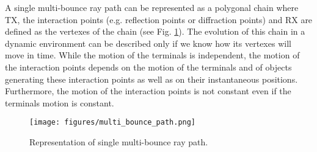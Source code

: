 A single multi-bounce ray path can be represented as a polygonal chain where TX, the interaction points (e.g. reflection points or diffraction points) and RX are defined as the vertexes of the chain (see Fig. \ref{ray_path}). The evolution of this chain in a dynamic environment can be described only if we know how its vertexes will move in time. While the motion of the terminals is independent, the motion of the interaction points depends on the motion of the terminals and of objects generating these interaction points as well as on their instantaneous positions. Furthermore, the motion of the interaction points is not constant even if the terminals motion is constant. \par

\begin{figure}[h!]
	\centering
	\texttt{[image: figures/multi\_bounce\_path.png]}
	\caption{Representation of single multi-bounce ray path.}
	\label{ray_path}
\end{figure}

